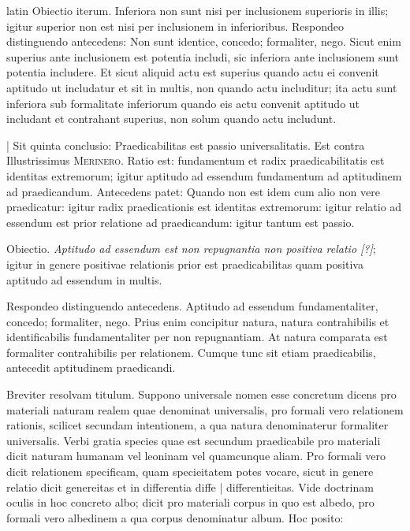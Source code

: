 \begin{otherlanguage*}{latin}
\pstart
  Obiectio iterum. Inferiora non sunt nisi per inclusionem superioris in illis; igitur superior non est nisi per inclusionem in inferioribus. Respondeo distinguendo antecedens: Non sunt identice, concedo; formaliter, nego. Sicut enim superius ante inclusionem est potentia includi, sic inferiora ante inclusionem sunt potentia includere. Et sicut aliquid actu est superius quando actu ei convenit aptitudo ut includatur et sit in multis, non quando actu includitur; ita actu sunt inferiora sub formalitate inferiorum quando eis actu convenit aptitudo ut includant et contrahant superius, non solum quando actu includunt. 
\pend

\pstart
  \textnormal{|} Sit quinta conclusio: Praedicabilitas est passio universalitatis. Est contra Illustrissimus \textsc{Merinero}\index[persons]{}. Ratio est: fundamentum et radix praedicabilitatis est identitas extremorum; igitur aptitudo ad essendum fundamentum ad aptitudinem ad praedicandum. Antecedens patet: Quando non est idem cum alio non vere praedicatur: igitur radix praedicationis est identitas extremorum: igitur relatio ad essendum est prior relatione ad praedicandum: igitur tantum est passio. 
\pend

\pstart
  Obiectio. \emph{Aptitudo ad essendum est non repugnantia non positiva relatio [?]}; igitur in genere positivae relationis prior est praedicabilitas quam positiva aptitudo ad essendum in multis. 
\pend

\pstart
  Respondeo distinguendo antecedens. Aptitudo ad essendum fundamentaliter, concedo; formaliter, nego. Prius enim concipitur natura, natura  contrahibilis et identificabilis fundamentaliter per non repugnantiam. At natura comparata est formaliter contrahibilis per relationem. Cumque tunc sit etiam praedicabilis, antecedit aptitudinem praedicandi. 
\pend

        \pstart
        \pend
      
\pstart
  Breviter resolvam titulum. Suppono universale nomen esse concretum dicens pro materiali naturam realem quae denominat universalis, pro formali vero relationem rationis, scilicet secundam intentionem, a qua natura denominaterur formaliter universalis. Verbi gratia species quae est secundum praedicabile pro materiali dicit naturam humanam vel leoninam vel quamcunque aliam. Pro formali vero dicit relationem specificam, quam specieitatem potes vocare, sicut in genere relatio dicit genereitas et in differentia diffe \textnormal{|}    differentieitas. Vide doctrinam oculis in hoc concreto albo; dicit pro materiali corpus in quo est albedo, pro formali vero albedinem a qua corpus denominatur album. Hoc posito: 
\pend


\end{otherlanguage*}
